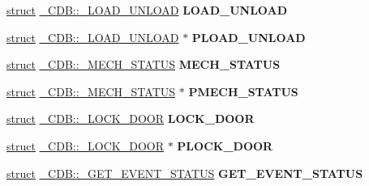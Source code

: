 \begin{DoxyCompactItemize}
\hyperlink{interfacestruct}{struct} \hyperlink{struct___c_d_b_1_1___l_o_a_d___u_n_l_o_a_d}{\+\_\+\+C\+D\+B\+::\+\_\+\+L\+O\+A\+D\+\_\+\+U\+N\+L\+O\+AD} {\bfseries L\+O\+A\+D\+\_\+\+U\+N\+L\+O\+AD}
\item 
\mbox{\label{union___c_d_b_a92735ada1edc151d210fc70755074973}} 
\hyperlink{interfacestruct}{struct} \hyperlink{struct___c_d_b_1_1___l_o_a_d___u_n_l_o_a_d}{\+\_\+\+C\+D\+B\+::\+\_\+\+L\+O\+A\+D\+\_\+\+U\+N\+L\+O\+AD} $\ast$ {\bfseries P\+L\+O\+A\+D\+\_\+\+U\+N\+L\+O\+AD}
\item 
\mbox{\label{union___c_d_b_a32693fbad3549ec56ae9237cba6c38c1}} 
\hyperlink{interfacestruct}{struct} \hyperlink{struct___c_d_b_1_1___m_e_c_h___s_t_a_t_u_s}{\+\_\+\+C\+D\+B\+::\+\_\+\+M\+E\+C\+H\+\_\+\+S\+T\+A\+T\+US} {\bfseries M\+E\+C\+H\+\_\+\+S\+T\+A\+T\+US}
\item 
\mbox{\label{union___c_d_b_a7b3714ea7dfb66dd0537f579f9edb6a4}} 
\hyperlink{interfacestruct}{struct} \hyperlink{struct___c_d_b_1_1___m_e_c_h___s_t_a_t_u_s}{\+\_\+\+C\+D\+B\+::\+\_\+\+M\+E\+C\+H\+\_\+\+S\+T\+A\+T\+US} $\ast$ {\bfseries P\+M\+E\+C\+H\+\_\+\+S\+T\+A\+T\+US}
\item 
\mbox{\label{union___c_d_b_a04a70b3c18f79965f0cf8ad268a9c6a6}} 
\hyperlink{interfacestruct}{struct} \hyperlink{struct___c_d_b_1_1___l_o_c_k___d_o_o_r}{\+\_\+\+C\+D\+B\+::\+\_\+\+L\+O\+C\+K\+\_\+\+D\+O\+OR} {\bfseries L\+O\+C\+K\+\_\+\+D\+O\+OR}
\item 
\mbox{\label{union___c_d_b_a3a9d4bddba3d57f6adc70235d482a498}} 
\hyperlink{interfacestruct}{struct} \hyperlink{struct___c_d_b_1_1___l_o_c_k___d_o_o_r}{\+\_\+\+C\+D\+B\+::\+\_\+\+L\+O\+C\+K\+\_\+\+D\+O\+OR} $\ast$ {\bfseries P\+L\+O\+C\+K\+\_\+\+D\+O\+OR}
\item 
\mbox{\label{union___c_d_b_abdb927e4495ddbbd0997a81b05896951}} 
\hyperlink{interfacestruct}{struct} \hyperlink{struct___c_d_b_1_1___g_e_t___e_v_e_n_t___s_t_a_t_u_s}{\+\_\+\+C\+D\+B\+::\+\_\+\+G\+E\+T\+\_\+\+E\+V\+E\+N\+T\+\_\+\+S\+T\+A\+T\+US} {\bfseries G\+E\+T\+\_\+\+E\+V\+E\+N\+T\+\_\+\+S\+T\+A\+T\+US}
\item 
\mbox{\label{union___c_d_b_adde42d5e6944b9f103c2b8712ca4a348}} 

\end{DoxyCompactItemize}
